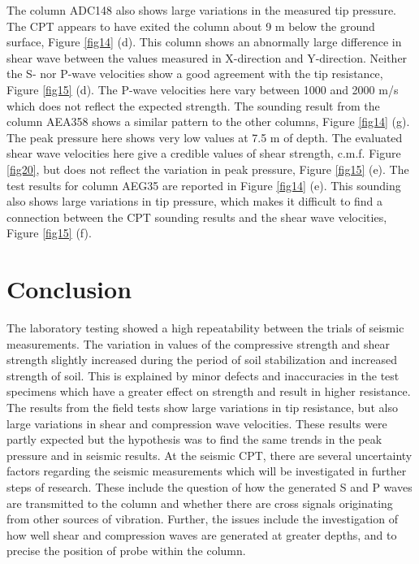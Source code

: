 \documentclass[final,3p,times,onecolumn,authoryear]{elsarticle}
\begin{document}
The column ADC148 also shows large variations in the measured tip pressure. The CPT appears to have exited the column about 9 m below the ground surface, Figure \ref{fig14} (d). This column shows an abnormally large difference in shear wave between the values measured in X-direction and Y-direction. Neither the S- nor P-wave velocities show a good agreement with the tip resistance, Figure \ref{fig15} (d). The P-wave velocities here vary between 1000 and 2000 m/s which does not reflect the expected strength. The sounding result from the column AEA358 shows a similar pattern to the other columns, Figure \ref{fig14} (g). The peak pressure here shows very low values at 7.5 m of depth. The evaluated shear wave velocities here give a credible values of shear strength, c.m.f. Figure \ref{fig20}, but does not reflect the variation in peak pressure, Figure \ref{fig15} (e). The test results for column AEG35 are reported in Figure \ref{fig14} (e). This sounding also shows large variations in tip pressure, which makes it difficult to find a connection between the CPT sounding results and the shear wave velocities, Figure \ref{fig15} (f). 

\section{Conclusion}

The laboratory testing showed a high repeatability between the trials of seismic measurements. The variation in values of the compressive strength and shear strength slightly increased during the period of soil stabilization and increased strength of soil. This is explained by minor defects and inaccuracies in the test specimens which have a greater effect on strength and result in higher resistance. The results from the field tests show large variations in tip resistance, but also large variations in shear and compression wave velocities. These results were partly expected but the hypothesis was to find the same trends in the peak pressure and in seismic results. At the seismic CPT, there are several uncertainty factors regarding the seismic measurements which will be investigated in further steps of research. These include the question of how the generated S and P waves are transmitted to the column and whether there are cross signals originating from other sources of vibration. Further, the issues include the investigation of how well shear and compression waves are generated at greater depths, and to precise the position of probe within the column.
    
\end{document}
